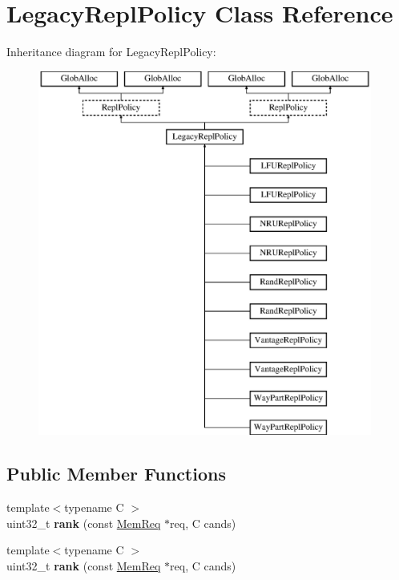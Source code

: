\hypertarget{classLegacyReplPolicy}{\section{Legacy\-Repl\-Policy Class Reference}
\label{classLegacyReplPolicy}
}
Inheritance diagram for Legacy\-Repl\-Policy\-:\begin{figure}[H]
\begin{center}
\leavevmode
\includegraphics[height=12.000000cm]{classLegacyReplPolicy}
\end{center}
\end{figure}
\subsection*{Public Member Functions}
\begin{DoxyCompactItemize}
\item 
\hypertarget{classLegacyReplPolicy_a4614042323dae45191699811a093ab98}{{\footnotesize template$<$typename C $>$ }\\uint32\-\_\-t {\bfseries rank} (const \hyperlink{structMemReq}{Mem\-Req} $\ast$req, C cands)}\label{classLegacyReplPolicy_a4614042323dae45191699811a093ab98}

\item 
\hypertarget{classLegacyReplPolicy_a4614042323dae45191699811a093ab98}{{\footnotesize template$<$typename C $>$ }\\uint32\-\_\-t {\bfseries rank} (const \hyperlink{structMemReq}{Mem\-Req} $\ast$req, C cands)}\label{classLegacyReplPolicy_a4614042323dae45191699811a093ab98}

\end{DoxyCompactItemize}
